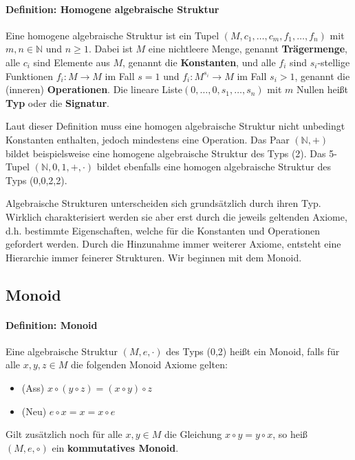 \paragraph{Definition: Homogene algebraische Struktur}
Eine homogene algebraische Struktur ist ein Tupel $(M,c_1,\dots,c_m,f_1,\dots,f_n)$ mit $m,n \in \mathbb{N}$ und $n \geq 1$. Dabei ist $M$ eine nichtleere Menge, genannt \textbf{Trägermenge}, alle $c_i$ sind Elemente aus $M$, genannt die \textbf{Konstanten}, und alle $f_i$ sind $s_i$-stellige Funktionen $f_i:M \rightarrow M$ im Fall $s = 1$ und $f_i:M^{s_i} \rightarrow M$ im Fall $s_i>1$, genannt die (inneren) \textbf{Operationen}. Die lineare Liste$(0,\dots,0,s_1,\dots,s_n)$ mit $m$ Nullen heißt \textbf{Typ} oder die \textbf{Signatur}.\newline

Laut dieser Definition muss eine homogen algebraische Struktur nicht unbedingt Konstanten enthalten, jedoch mindestens eine Operation. Das Paar $(\mathbb{N},+)$ bildet beispielsweise eine homogene algebraische Struktur des Typs (2). Das 5-Tupel $(\mathbb{N},0,1,+,\cdot)$ bildet ebenfalls eine homogen algebraische Struktur des Typs (0,0,2,2).

Algebraische Strukturen unterscheiden sich grundsätzlich durch ihren Typ. Wirklich charakterisiert werden sie aber erst durch die jeweils geltenden Axiome, d.h. bestimmte Eigenschaften, welche für die Konstanten und Operationen gefordert werden. Durch die Hinzunahme immer weiterer Axiome, entsteht eine Hierarchie immer feinerer Strukturen. Wir beginnen mit dem Monoid.\cite[S. 355, 356]{Berghammer.2021}

\subsection{Monoid}

\paragraph{Definition: Monoid}
Eine algebraische Struktur $(M,e,\cdot)$ des Typs (0,2) heißt ein Monoid, falls für alle $x,y,z\in M$ die folgenden Monoid Axiome gelten:
\begin{itemize}
    \item (Ass) $x \circ (y \circ z) = (x \circ y) \circ z$
    \item (Neu) $e \circ x = x = x \circ e$
\end{itemize}  Gilt zusätzlich noch für alle $x,y \in M$ die Gleichung $x \circ y = y \circ x$, so heiß $(M,e,\circ)$ ein \textbf{kommutatives Monoid}.\\

